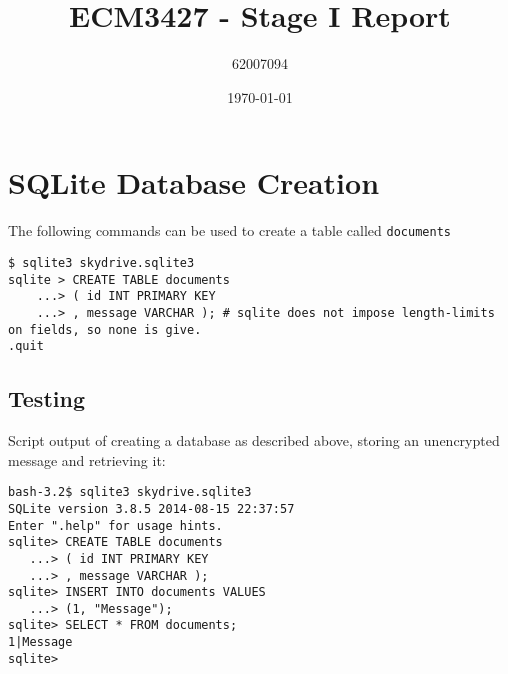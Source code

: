 \documentclass[11pt]{article}
\begin{document}
    \lstset{
    	basicstyle=\ttfamily,
    	breaklines=true,
		numbers=left,
    }
    \title{ECM3427 - Stage I Report}
    \author{62007094}
    \date{\today}
    \maketitle
    
    \section{SQLite Database Creation}
    The following commands can be used to create a table called \texttt{documents}
    
    \begin{lstlisting}
$ sqlite3 skydrive.sqlite3
sqlite > CREATE TABLE documents
    ...> ( id INT PRIMARY KEY  
    ...> , message VARCHAR ); # sqlite does not impose length-limits on fields, so none is give.
.quit
    \end{lstlisting}
	
	\subsection{Testing}
	Script output of creating a database as described above, storing an unencrypted message and retrieving it:
	\begin{lstlisting}
bash-3.2$ sqlite3 skydrive.sqlite3
SQLite version 3.8.5 2014-08-15 22:37:57
Enter ".help" for usage hints.
sqlite> CREATE TABLE documents
   ...> ( id INT PRIMARY KEY
   ...> , message VARCHAR );
sqlite> INSERT INTO documents VALUES
   ...> (1, "Message");
sqlite> SELECT * FROM documents;
1|Message
sqlite>
\end{lstlisting}
	
\end{document}
